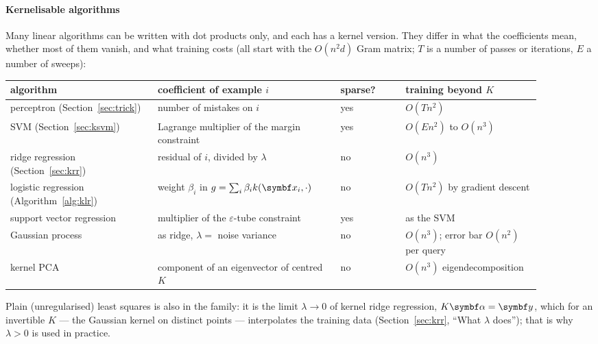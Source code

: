 \documentclass[11pt]{article}
\newcommand{\y}{\vect{y}}
\newcommand{\valpha}{\vect{\alpha}}
\begin{document}
\paragraph{Kernelisable algorithms} Many linear algorithms can be written with dot products only, and each has a kernel
version. They differ in what the coefficients mean, whether most of them vanish, and what training costs (all start with
the $O(n^2 d)$ Gram matrix; $T$ is a number of passes or iterations, $E$ a number of sweeps):
\begin{center}\small
\begin{tabular}{@{}L{0.25\linewidth}L{0.31\linewidth}L{0.11\linewidth}L{0.23\linewidth}@{}}
\toprule
algorithm & coefficient of example $i$ & sparse? & training beyond $K$ \\
\midrule
perceptron (Section~\ref{sec:trick}) & number of mistakes on $i$ & yes & $O(Tn^2)$ \\
SVM (Section~\ref{sec:ksvm}) & Lagrange multiplier of the margin constraint & yes & $O(En^2)$ to $O(n^3)$ \\
ridge regression (Section~\ref{sec:krr}) & residual of $i$, divided by $\lambda$ & no & $O(n^3)$ \\
logistic regression (Algorithm~\ref{alg:klr}) & weight $\beta_i$ in $g = \sum_i \beta_i k(\x_i, \cdot)$ & no & $O(Tn^2)$ by gradient descent \\
support vector regression & multiplier of the $\varepsilon$-tube constraint & yes & as the SVM \\
Gaussian process & as ridge, $\lambda = $ noise variance & no & $O(n^3)$; error bar $O(n^2)$ per query \\
kernel PCA & component of an eigenvector of centred $K$ & no & $O(n^3)$ eigendecomposition \\
\bottomrule
\end{tabular}
\end{center}
Plain (unregularised) least squares is also in the family: it is the limit $\lambda \to 0$ of kernel ridge regression,
$K\valpha = \y$, which for an invertible $K$ --- the Gaussian kernel on distinct points --- interpolates the training data
(Section~\ref{sec:krr}, ``What $\lambda$ does''); that is why $\lambda > 0$ is used in practice.
\end{document}
